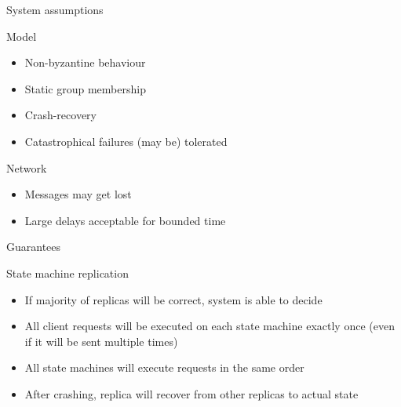 \documentclass[hyperref={pdfpagelabels=true},11pt,compress,trans]{beamer}
\begin{document}
\begin{frame}{System assumptions}
  \begin{block}{Model}
    \vspace{-1em}\vspace{-\parskip}\vspace{-\lineskip}
    \begin{itemize}
      \item Non-byzantine behaviour
      \item Static group membership
      \item Crash-recovery
      \item Catastrophical failures (may be) tolerated
     \end{itemize}
  \end{block}

  \begin{block}{Network}
    \vspace{-1em}\vspace{-\parskip}\vspace{-\lineskip}
    \begin{itemize}
      \item Messages may get lost
      \item Large delays acceptable for bounded time
    \end{itemize}
  \end{block}
\end{frame}

\begin{frame}{Guarantees}
  \begin{block}{State machine replication}
    \vspace{-1em}\vspace{-\parskip}\vspace{-\lineskip}
    \begin{itemize}
      \item If majority of replicas will be correct, system is able to decide
      \item All client requests will be executed on each state machine exactly once (even if it will be sent multiple times)
      \item All state machines will execute requests in the same order
      \item After crashing, replica will recover from other replicas to actual state
    \end{itemize}
  \end{block}
\end{frame}
\end{document}
